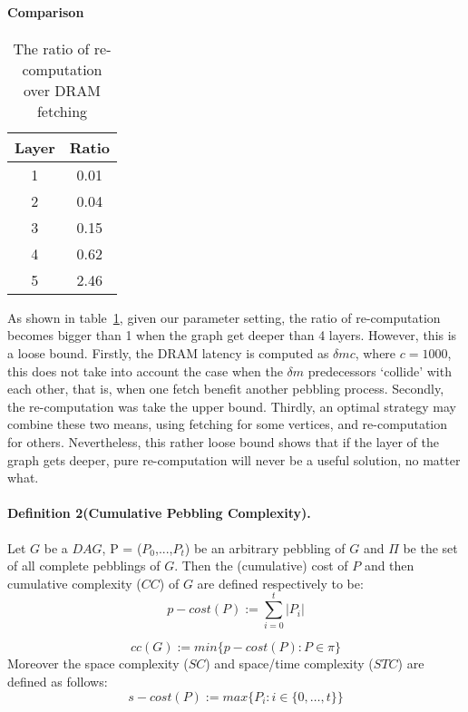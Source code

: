 \documentclass[a4paper, oneside]{article}
\begin{document}
\paragraph{Comparison}
\begin{table}
  \centering
  \begin{tabular}{|c|c|}
     \hline
     Layer & Ratio \\ \hline
     1 & 0.01 \\
     2 & 0.04 \\
     3 & 0.15 \\
     4 & 0.62 \\
     5 & 2.46 \\
     \hline
   \end{tabular}
  \caption{The ratio of re-computation over DRAM fetching}\label{table::recomp-dram-ratio}
\end{table}

As shown in table~\ref{table::recomp-dram-ratio}, given our parameter setting, the ratio of re-computation becomes bigger than 1 when the graph get deeper than 4 layers.
However, this is a loose bound. Firstly, the DRAM latency is computed as $\delta mc$, where $c = 1000$, this does not take into account the case when the $\delta m$
predecessors `collide' with each other, that is, when one fetch benefit another pebbling process. Secondly, the re-computation was take the upper bound. Thirdly, an
optimal strategy may combine these two means, using fetching for some vertices, and re-computation for others. Nevertheless, this rather loose bound shows that if
the layer of the graph gets deeper, pure re-computation will never be a useful solution, no matter what.

\paragraph{Definition 2(Cumulative Pebbling Complexity).}
Let $G$ be a $DAG$, P = ($P_0$,...,$P_t$) be an arbitrary pebbling of $G$ and $\Pi$ be the set of all complete pebblings of $G$. Then the (cumulative) cost of $P$ and then cumulative complexity ($CC$) of $G$ are defined respectively to be:\\
  \begin{equation}
    p-cost(P):= \sum\limits_{i=0}^t|P_i|
  \end{equation}

  \begin{equation}
    cc(G):= min\{p-cost(P):P \in \pi \}
  \end{equation}
Moreover the space complexity ($SC$) and space/time complexity ($STC$) are defined as follows:
  \begin{equation}
    s-cost(P):= max\{ P_i:i\in \{ 0,\dots,t \} \}
  \end{equation}
\end{document}
